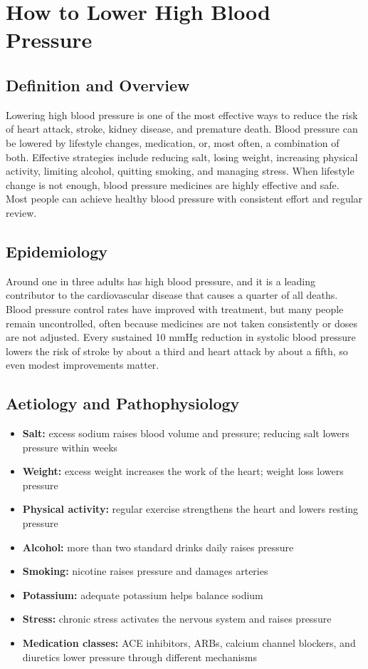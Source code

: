 \chapter{How to Lower High Blood Pressure}

\section*{Definition and Overview}
Lowering high blood pressure is one of the most effective ways to reduce the risk of heart attack, stroke, kidney disease, and premature death. Blood pressure can be lowered by lifestyle changes, medication, or, most often, a combination of both. Effective strategies include reducing salt, losing weight, increasing physical activity, limiting alcohol, quitting smoking, and managing stress. When lifestyle change is not enough, blood pressure medicines are highly effective and safe. Most people can achieve healthy blood pressure with consistent effort and regular review.

\section*{Epidemiology}
Around one in three adults has high blood pressure, and it is a leading contributor to the cardiovascular disease that causes a quarter of all deaths. Blood pressure control rates have improved with treatment, but many people remain uncontrolled, often because medicines are not taken consistently or doses are not adjusted. Every sustained 10 mmHg reduction in systolic blood pressure lowers the risk of stroke by about a third and heart attack by about a fifth, so even modest improvements matter.

\section*{Aetiology and Pathophysiology}
\begin{itemize}
    \item \textbf{Salt:} excess sodium raises blood volume and pressure; reducing salt lowers pressure within weeks
    \item \textbf{Weight:} excess weight increases the work of the heart; weight loss lowers pressure
    \item \textbf{Physical activity:} regular exercise strengthens the heart and lowers resting pressure
    \item \textbf{Alcohol:} more than two standard drinks daily raises pressure
    \item \textbf{Smoking:} nicotine raises pressure and damages arteries
    \item \textbf{Potassium:} adequate potassium helps balance sodium
    \item \textbf{Stress:} chronic stress activates the nervous system and raises pressure
    \item \textbf{Medication classes:} ACE inhibitors, ARBs, calcium channel blockers, and diuretics lower pressure through different mechanisms
\end{itemize}

